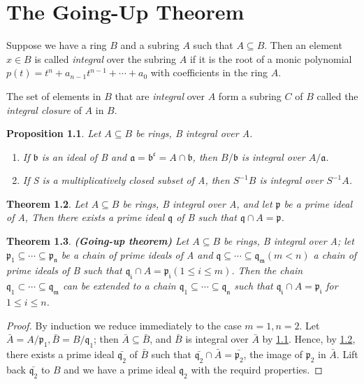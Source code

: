 \documentclass[]{report}
\newtheorem{theorem}{Theorem}[section]
\newtheorem{prop}[theorem]{Proposition}
\begin{document}
\chapter{The Going-Up Theorem}

Suppose we have a ring $B$ and a subring $A$ such that $A \subseteq B$. Then an element $x \in B$ is called \textit{integral} over the subring $A$ if it is the root of a monic polynomial $p(t) = t^n + a_{n-1}t^{n-1} + \cdots + a_0$ with coefficients in the ring $A$.

The set of elements in $B$ that are \textit{integral} over $A$ form a subring $C$ of $B$ called the \textit{integral closure} of $A$ in $B$.

\begin{prop}\label{5.6}
    Let $A\subseteq B$ be rings, B integral over A.
    \begin{enumerate}
        \item If $\mathfrak{b}$ is an ideal of B and $\mathfrak{a = b^c} = A \cap \mathfrak{b}$, then $B/\mathfrak{b}$ is integral over $A/\mathfrak{a}$. 
        \item If S is a multiplicatively closed subset of A, then $S^{-1}B$ is integral over $S^{-1}A$.
    \end{enumerate}
\end{prop}
    

\begin{theorem}\label{5.10}
    Let $A\subseteq B$ be rings, B integral over A, and let $\mathfrak{p}$ be a prime ideal of A, Then there exists a prime ideal $\mathfrak{q}$ of B such that $\mathfrak{q}\cap A = \mathfrak{p}$. 
\end{theorem}

\begin{theorem}
    \textbf{(Going-up theorem)} Let $A \subseteq B$ be rings, B integral over A; let $\mathfrak{p_1 \subseteq \cdots \subseteq p_n}$ be a chain of prime ideals of A and $\mathfrak{q \subseteq \cdots \subseteq q_m} (m < n )$ a chain of prime ideals of B such that $\mathfrak{q_i} \cap A = \mathfrak{p_i} (1 \leq i \leq m)$. Then the chain $\mathfrak{q_1 \subset \cdots \subseteq q_m}$ can be extended to a chain $\mathfrak{q_1 \subseteq \cdots \subseteq q_n}$ such that $\mathfrak{q_i} \cap A = \mathfrak{p_i}$ for $1 \leq i \leq n$.
\end{theorem}

\begin{proof}
By induction we reduce immediately to the case $m = 1, n = 2$. Let $\bar{A} = A/\mathfrak{p}_1, \bar{B} = B/\mathfrak{q}_1$; then $\bar{A} \subseteq \bar{B}$, and $\bar{B}$ is integral over $\bar{A}$ by \ref{5.6}. Hence, by \ref{5.10}, there exists a prime ideal $\bar{\mathfrak{q}_2}$ of $\bar{B}$ such that $\bar{\mathfrak{q}_2} \cap \bar{A} = \bar{\mathfrak{p}_2}$, the image of $\mathfrak{p}_2$ in $\bar{A}$. Lift back $\bar{\mathfrak{q}_2}$ to $B$ and we have a prime ideal $\mathfrak{q}_2$ with the requird properties. 
\end{proof}
\end{document}
